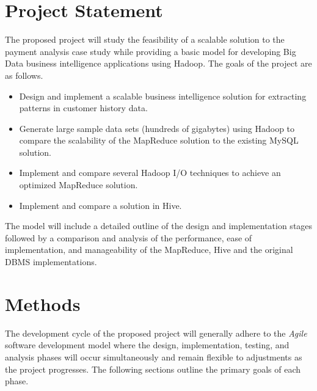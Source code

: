 \documentclass[letterpaper,12pt,titlepage]{article}
\begin{document}
\section{Project Statement}
The proposed project will study the feasibility of a scalable solution to the
payment analysis case study while providing a basic model for developing Big
Data business intelligence applications using Hadoop. The goals of the project
are as follows.
\begin{singlespace}
\begin{itemize}
  \item Design and implement a scalable business intelligence solution for
        extracting patterns in customer history data.
  \item Generate large sample data sets (hundreds of gigabytes) using Hadoop
        to compare the scalability of the MapReduce solution to the existing
        MySQL solution.
  \item Implement and compare several Hadoop I/O techniques to achieve an
        optimized MapReduce solution. 
  \item Implement and compare a solution in Hive.
\end{itemize}
\end{singlespace}
The model will include a detailed outline of the design and implementation
stages followed by a comparison and analysis of the performance, ease of
implementation, and manageability of the MapReduce, Hive and the original DBMS
implementations.

\section{Methods}
The development cycle of the proposed project will generally adhere to the
\textit{Agile} software development model where the design, implementation,
testing, and analysis phases will occur simultaneously and remain flexible to
adjustments as the project progresses. The following sections outline the
primary goals of each phase. 
\end{document}
